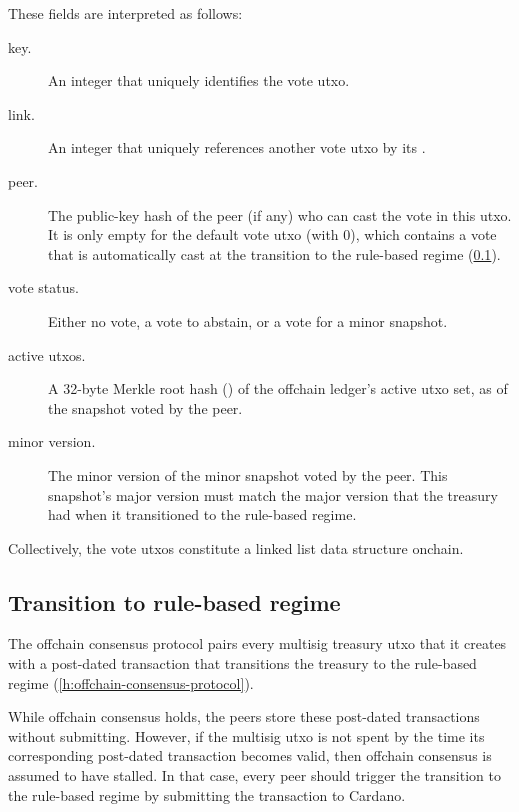 \documentclass[../hydrozoa.tex]{subfiles}
\begin{document}
These fields are interpreted as follows:
\begin{description}
  \item[key.] An integer that uniquely identifies the vote utxo.
  \item[link.] An integer that uniquely references another vote utxo by its .
  \item[peer.] The public-key hash of the peer (if any) who can cast the vote in this utxo. It is only empty for the default vote utxo (with  0), which contains a vote that is automatically cast at the transition to the rule-based regime (\cref{h:rule-based-transition}).
  \item[vote status.] Either no vote, a vote to abstain, or a vote for a minor snapshot.
  \item[active utxos.] A 32-byte Merkle root hash () of the offchain ledger's active utxo set, as of the snapshot voted by the peer.
  \item[minor version.] The minor version of the minor snapshot voted by the peer. This snapshot's major version must match the major version that the treasury had when it transitioned to the rule-based regime.
\end{description}

Collectively, the vote utxos constitute a linked list data structure onchain.

\subsection{Transition to rule-based regime}%
\label{h:rule-based-transition}

The offchain consensus protocol pairs every multisig treasury utxo that it creates with a post-dated transaction that transitions the treasury to the rule-based regime (\cref{h:offchain-consensus-protocol}).

While offchain consensus holds, the peers store these post-dated transactions without submitting.
However, if the multisig utxo is not spent by the time its corresponding post-dated transaction becomes valid, then offchain consensus is assumed to have stalled.
In that case, every peer should trigger the transition to the rule-based regime by submitting the transaction to Cardano.
\end{document}
